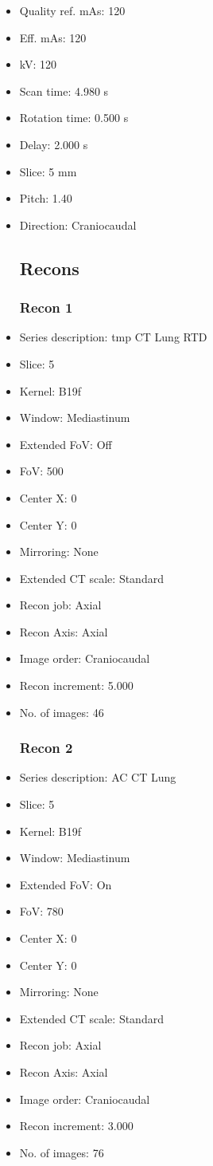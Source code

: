 \documentclass[12pt]{article}
\begin{document}
\begin{itemize}
\subsection{Scan}
\item Quality ref. mAs: 120\item Eff. mAs: 120\item kV: 120\item Scan time: 4.980 s\item Rotation time: 0.500 s\item Delay: 2.000 s\item Slice: 5 mm\item Pitch: 1.40\item Direction: Craniocaudal\subsection{Recons}

\subsubsection{Recon 1}
\item Series description: tmp CT Lung RTD
\item Slice: 5
\item Kernel: B19f
\item Window: Mediastinum
\item Extended FoV: Off
\item FoV: 500
\item Center X: 0
\item Center Y: 0
\item Mirroring: None
\item Extended CT scale: Standard
\item Recon job: Axial
\item Recon Axis: Axial
\item Image order: Craniocaudal
\item Recon increment: 5.000
\item No. of images: 46
\subsubsection{Recon 2}
\item Series description: AC CT Lung
\item Slice: 5
\item Kernel: B19f
\item Window: Mediastinum
\item Extended FoV: On
\item FoV: 780
\item Center X: 0
\item Center Y: 0
\item Mirroring: None
\item Extended CT scale: Standard
\item Recon job: Axial
\item Recon Axis: Axial
\item Image order: Craniocaudal
\item Recon increment: 3.000
\item No. of images: 76

\end{itemize}
\end{document}
